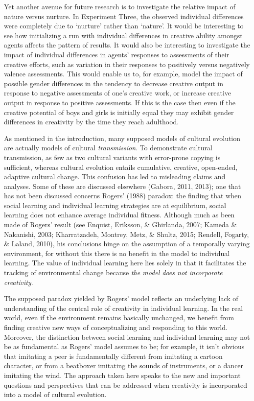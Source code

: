 \documentclass[a4paper,12pt,man,british]{apa6}
\begin{document}
Yet another avenue for future research is to investigate the relative impact of nature versus nurture. In Experiment Three, the observed individual differences were completely due to `nurture' rather than `nature'. It would be interesting to see how initializing a run with individual differences in creative ability amongst agents affects the pattern of results. It would also be interesting to investigate the impact of individual differences in agents' responses to assessments of their creative efforts, such as variation in their responses to positively versus negatively valence assessments. This would enable us to, for example, model the  impact of possible gender differences in the tendency to decrease creative output in response to negative assessments of one's creative work, or increase creative output in response to positive assessments. If this is the case then even if the creative potential of boys and girls is initially equal they may exhibit gender differences in creativity by the time they reach adulthood. 

As mentioned in the introduction, many supposed models of cultural evolution are actually models of cultural \emph{transmission}. To demonstrate cultural transmission, as few as two cultural variants with error-prone copying is sufficient, whereas cultural evolution entails cumulative, creative, open-ended, adaptive cultural change. This confusion has led to misleading claims and analyses. Some of these are discussed elsewhere (Gabora, 2011, 2013); one that has not been discussed concerns Rogers’ (1988) paradox: the finding that when social learning and individual learning strategies are at equilibrium, social learning does not enhance average individual fitness. Although much as been made of Rogers' result (see Enquist, Eriksson, \& Ghirlanda, 2007; Kameda \& Nakanishi, 2003; Kharratzadeh, Montrey, Metz, \& Shultz, 2015; Rendell, Fogarty, \& Laland, 2010), his conclusions hinge on the assumption of a temporally varying environment, for without this there is no benefit in the model to individual learning. The value of individual learning here lies solely in that it facilitates the tracking of environmental change because \emph{the model does not incorporate creativity}. 

The supposed paradox yielded by Rogers' model reflects an underlying lack of understanding of the central role of creativity in individual learning. In the real world, even if the environment remains basically unchanged, we benefit from finding creative new ways of conceptualizing and responding to this world. Moreover, the distinction between social learning and individual learning may not be as fundamental as Rogers' model assumes to be; for example, it isn't obvious that imitating a peer is fundamentally different from imitating a cartoon character, or from a beatboxer imitating the sounds of instruments, or a dancer imitating the wind. The approach taken here speaks to the new and important questions and perspectives that can be addressed when creativity is incorporated into a model of cultural evolution.
\end{document}
